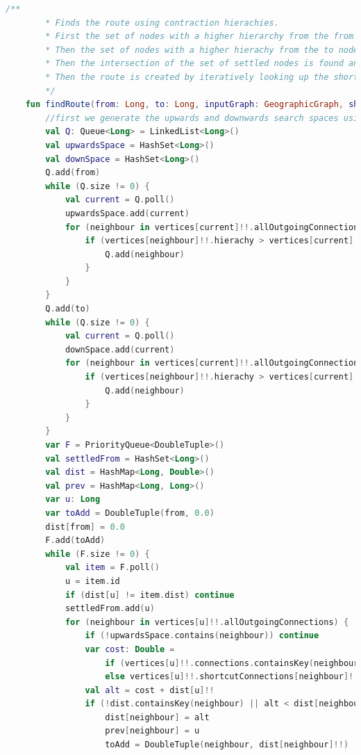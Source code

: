 \documentclass[11pt,twoside,a4paper]{report}
\begin{document}
\begin{lstlisting}[language=kotlin]
    /**
        * Finds the route using contraction hierachies.
        * First the set of nodes with a higher hierarchy from the from node are calculated
        * Then the set of nodes with a higher hierachy from the to node (backwards) are calculated
        * Then the intersection of the set of settled nodes is found and the minimum found.
        * Then the route is created by iteratively looking up the shortcuts
        */
    fun findRoute(from: Long, to: Long, inputGraph: GeographicGraph, showVisited: Boolean): List<Long> {
        //first we generate the upwards and downwards search spaces using simple queues
        val Q: Queue<Long> = LinkedList<Long>()
        val upwardsSpace = HashSet<Long>()
        val downSpace = HashSet<Long>()
        Q.add(from)
        while (Q.size != 0) {
            val current = Q.poll()
            upwardsSpace.add(current)
            for (neighbour in vertices[current]!!.allOutgoingConnections) {
                if (vertices[neighbour]!!.hierachy > vertices[current]!!.hierachy && !upwardsSpace.contains(neighbour)) {
                    Q.add(neighbour)
                }
            }
        }
        Q.add(to)
        while (Q.size != 0) {
            val current = Q.poll()
            downSpace.add(current)
            for (neighbour in vertices[current]!!.allOutgoingConnections) {
                if (vertices[neighbour]!!.hierachy > vertices[current]!!.hierachy && !downSpace.contains(neighbour)) {
                    Q.add(neighbour)
                }
            }
        }
        var F = PriorityQueue<DoubleTuple>()
        val settledFrom = HashSet<Long>()
        val dist = HashMap<Long, Double>()
        val prev = HashMap<Long, Long>()
        var u: Long
        var toAdd = DoubleTuple(from, 0.0)
        dist[from] = 0.0
        F.add(toAdd)
        while (F.size != 0) {
            val item = F.poll()
            u = item.id
            if (dist[u] != item.dist) continue
            settledFrom.add(u)
            for (neighbour in vertices[u]!!.allOutgoingConnections) {
                if (!upwardsSpace.contains(neighbour)) continue
                var cost: Double =
                    if (vertices[u]!!.connections.containsKey(neighbour)) vertices[u]!!.connections[neighbour]!!
                    else vertices[u]!!.shortcutConnections[neighbour]!!
                val alt = cost + dist[u]!!
                if (!dist.containsKey(neighbour) || alt < dist[neighbour]!!) {
                    dist[neighbour] = alt
                    prev[neighbour] = u
                    toAdd = DoubleTuple(neighbour, dist[neighbour]!!)

\end{lstlisting}
\end{document}
